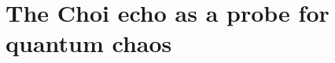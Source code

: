 \documentclass[pra,twocolumn,aps,showpacs,superscriptaddress,longbibliography]{revtex4-2}%
\begin{document}
\section{The Choi echo as a probe for quantum chaos}\label{sec:chaos_probe}
\end{document}
